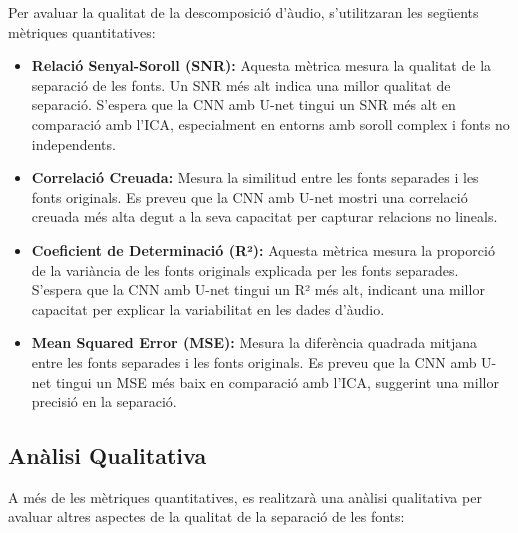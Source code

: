 \documentclass[10pt,a4paper,twocolumn,twoside]{article}
\begin{document}
Per avaluar la qualitat de la descomposició d'àudio, s'utilitzaran les següents mètriques quantitatives:

\begin{itemize}
    \item \textbf{Relació Senyal-Soroll (SNR):} \cite{Johnson:2006_SNR} Aquesta mètrica mesura la qualitat de la separació de les fonts. Un SNR més alt indica una millor qualitat de separació. S'espera que la CNN amb U-net tingui un SNR més alt en comparació amb l'ICA, especialment en entorns amb soroll complex i fonts no independents.
    
    \item \textbf{Correlació Creuada:} Mesura la similitud entre les fonts separades i les fonts originals. Es preveu que la CNN amb U-net mostri una correlació creuada més alta degut a la seva capacitat per capturar relacions no lineals.
    
    \item \textbf{Coeficient de Determinació (R²):} \cite{akossou2013impact_r_squared} Aquesta mètrica mesura la proporció de la variància de les fonts originals explicada per les fonts separades. S'espera que la CNN amb U-net tingui un R² més alt, indicant una millor capacitat per explicar la variabilitat en les dades d'àudio.
    
    \item \textbf{Mean Squared Error (MSE):} \cite{5937917_MSE} Mesura la diferència quadrada mitjana entre les fonts separades i les fonts originals. Es preveu que la CNN amb U-net tingui un MSE més baix en comparació amb l'ICA, suggerint una millor precisió en la separació.
\end{itemize}

\subsection{Anàlisi Qualitativa}

A més de les mètriques quantitatives, es realitzarà una anàlisi qualitativa per avaluar altres aspectes de la qualitat de la separació de les fonts:
\end{document}
